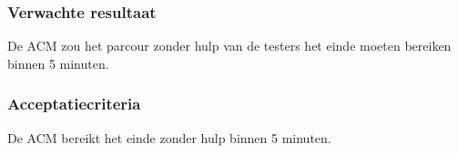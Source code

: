 \subsubsection{Verwachte resultaat}
\begin{flushleft}
    De ACM zou het parcour zonder hulp van de testers het einde moeten bereiken binnen 5 minuten.
\end{flushleft}
\subsubsection{Acceptatiecriteria}
\begin{flushleft}
    De ACM bereikt het einde zonder hulp binnen 5 minuten.
\end{flushleft}